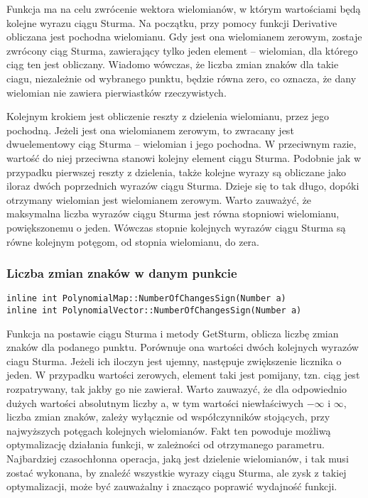 \documentclass[twoside,a4paper]{book}
\begin{document}
Funkcja ma na celu zwrócenie wektora wielomianów, w którym wartościami będą kolejne wyrazu ciągu Sturma. Na początku, przy pomocy funkcji Derivative obliczana jest pochodna wielomianu. Gdy jest ona wielomianem zerowym, zostaje zwrócony ciąg Sturma, zawierający tylko jeden element – wielomian, dla którego ciąg ten jest obliczany. Wiadomo wówczas, że liczba zmian znaków dla takie ciagu, niezależnie od wybranego punktu, będzie równa zero, co oznacza, że dany wielomian nie zawiera pierwiastków rzeczywistych.

Kolejnym krokiem jest obliczenie reszty z dzielenia wielomianu, przez jego pochodną. Jeżeli jest ona wielomianem zerowym, to zwracany jest dwuelementowy ciąg Sturma – wielomian i jego pochodna. W przeciwnym razie, wartość do niej przeciwna stanowi kolejny element ciągu Sturma. Podobnie jak w przypadku pierwszej reszty z dzielenia, także kolejne wyrazy są obliczane jako iloraz dwóch poprzednich wyrazów ciągu Sturma. Dzieje się to tak długo, dopóki otrzymany wielomian jest wielomianem zerowym. Warto zauważyć, że maksymalna liczba wyrazów ciągu Sturma jest równa stopniowi wielomianu, powiększonemu o jeden. Wówczas stopnie kolejnych wyrazów ciągu Sturma są równe kolejnym potęgom, od stopnia wielomianu, do zera.
\\

\subsubsection{Liczba zmian znaków w danym punkcie}
\begin{lstlisting}
inline int PolynomialMap::NumberOfChangesSign(Number a)
inline int PolynomialVector::NumberOfChangesSign(Number a)
\end{lstlisting}

Funkcja na postawie ciągu Sturma i metody GetSturm, oblicza liczbę zmian znaków dla podanego punktu. Porównuje ona wartości dwóch kolejnych wyrazów ciagu Sturma. Jeżeli ich iloczyn jest ujemny, następuje zwiększenie licznika o jeden. W przypadku wartości zerowych, element taki jest pomijany, tzn. ciąg jest rozpatrywany, tak jakby go nie zawierał. Warto zauwazyć, że dla odpowiednio dużych wartości absolutnym liczby a, w tym wartości niewłaściwych $-\infty$ i $\infty$, liczba zmian znaków, zależy wyłącznie od współczynników stojących, przy najwyższych potęgach kolejnych wielomianów. Fakt ten powoduje możliwą optymalizację działania funkcji, w zależności od otrzymanego parametru. Najbardziej czasochłonna operacja, jaką jest dzielenie wielomianów, i tak musi zostać wykonana, by znaleźć wszystkie wyrazy ciągu Sturma, ale zysk z takiej optymalizacji, może być zauważalny i znacząco poprawić wydajność funkcji.
\end{document}
